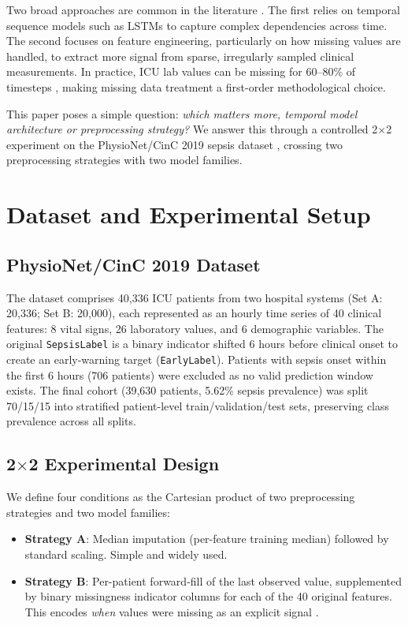 \documentclass[conference]{IEEEtran}
\begin{document}
Two broad approaches are common in the literature \cite{moor2021early}. The first relies on temporal sequence
models such as LSTMs \cite{hochreiter1997long} to capture complex dependencies
across time. The second focuses on feature engineering, particularly on how
missing values are handled, to extract more signal from sparse, irregularly sampled
clinical measurements. In practice, ICU lab values can be missing for 60--80\% of
timesteps \cite{harutyunyan2019multitask}, making missing data treatment a first-order
methodological choice.

This paper poses a simple question: \textit{which matters more, temporal model
architecture or preprocessing strategy?} We answer this through a controlled
2$\times$2 experiment on the PhysioNet/CinC 2019 sepsis dataset \cite{reyna2019early},
crossing two preprocessing strategies with two model families.

\section{Dataset and Experimental Setup}

\subsection{PhysioNet/CinC 2019 Dataset}

The dataset comprises 40,336 ICU patients from two hospital systems (Set A: 20,336;
Set B: 20,000), each represented as an hourly time series of 40 clinical features:
8 vital signs, 26 laboratory values, and 6 demographic variables. The original
\texttt{SepsisLabel} is a binary indicator shifted 6 hours before clinical onset to
create an early-warning target (\texttt{EarlyLabel}). Patients with sepsis onset
within the first 6 hours (706 patients) were excluded as no valid prediction window
exists. The final cohort (39,630 patients, 5.62\% sepsis prevalence) was split
70/15/15 into stratified patient-level train/validation/test sets, preserving class
prevalence across all splits.

\subsection{2$\times$2 Experimental Design}

We define four conditions as the Cartesian product of two preprocessing strategies
and two model families:

\begin{itemize}
  \item \textbf{Strategy A}: Median imputation (per-feature training median) followed
        by standard scaling. Simple and widely used.
  \item \textbf{Strategy B}: Per-patient forward-fill of the last observed value,
        supplemented by binary missingness indicator columns for each of the 40
        original features. This encodes \textit{when} values were missing as an
        explicit signal \cite{rubin1976inference,che2018recurrent}.
\end{itemize}
\end{document}
